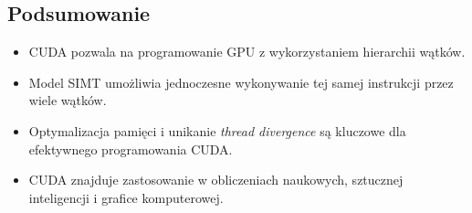 \subsection{Podsumowanie}
\begin{itemize}
    \item CUDA pozwala na programowanie GPU z wykorzystaniem hierarchii wątków.
    \item Model SIMT umożliwia jednoczesne wykonywanie tej samej instrukcji przez wiele wątków.
    \item Optymalizacja pamięci i unikanie \textit{thread divergence} są kluczowe dla efektywnego programowania CUDA.
    \item CUDA znajduje zastosowanie w obliczeniach naukowych, sztucznej inteligencji i grafice komputerowej.
\end{itemize}
